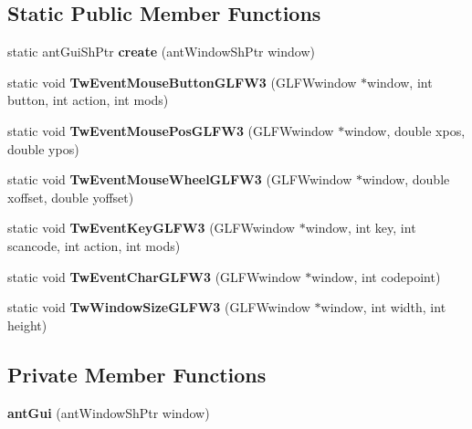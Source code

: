 \subsection*{Static Public Member Functions}
\begin{DoxyCompactItemize}
\item 
\hypertarget{classant_gui_aa847c3474231b558d26e1cf1f9fe4f91}{static ant\+Gui\+Sh\+Ptr {\bfseries create} (ant\+Window\+Sh\+Ptr window)}\label{classant_gui_aa847c3474231b558d26e1cf1f9fe4f91}

\item 
\hypertarget{classant_gui_a3bfa2b7f8c6b4fcf5ec8304dff581617}{static void {\bfseries Tw\+Event\+Mouse\+Button\+G\+L\+F\+W3} (G\+L\+F\+Wwindow $\ast$window, int button, int action, int mods)}\label{classant_gui_a3bfa2b7f8c6b4fcf5ec8304dff581617}

\item 
\hypertarget{classant_gui_abe31b4c0947f0910aa884c1be833f721}{static void {\bfseries Tw\+Event\+Mouse\+Pos\+G\+L\+F\+W3} (G\+L\+F\+Wwindow $\ast$window, double xpos, double ypos)}\label{classant_gui_abe31b4c0947f0910aa884c1be833f721}

\item 
\hypertarget{classant_gui_a8a046204e11b5274d11e3e6a45ea6d20}{static void {\bfseries Tw\+Event\+Mouse\+Wheel\+G\+L\+F\+W3} (G\+L\+F\+Wwindow $\ast$window, double xoffset, double yoffset)}\label{classant_gui_a8a046204e11b5274d11e3e6a45ea6d20}

\item 
\hypertarget{classant_gui_a3f2370a3570eddf3a5c8344cc99f5dbf}{static void {\bfseries Tw\+Event\+Key\+G\+L\+F\+W3} (G\+L\+F\+Wwindow $\ast$window, int key, int scancode, int action, int mods)}\label{classant_gui_a3f2370a3570eddf3a5c8344cc99f5dbf}

\item 
\hypertarget{classant_gui_a13477eb70c741334289ccd2d8a932cfa}{static void {\bfseries Tw\+Event\+Char\+G\+L\+F\+W3} (G\+L\+F\+Wwindow $\ast$window, int codepoint)}\label{classant_gui_a13477eb70c741334289ccd2d8a932cfa}

\item 
\hypertarget{classant_gui_a3f2322380ca04b7f8494057751a1fe9e}{static void {\bfseries Tw\+Window\+Size\+G\+L\+F\+W3} (G\+L\+F\+Wwindow $\ast$window, int width, int height)}\label{classant_gui_a3f2322380ca04b7f8494057751a1fe9e}

\end{DoxyCompactItemize}
\subsection*{Private Member Functions}
\begin{DoxyCompactItemize}
\item 
\hypertarget{classant_gui_ab6adc95e908a4402d7d5fade947d67f2}{{\bfseries ant\+Gui} (ant\+Window\+Sh\+Ptr window)}\label{classant_gui_ab6adc95e908a4402d7d5fade947d67f2}

\end{DoxyCompactItemize}
